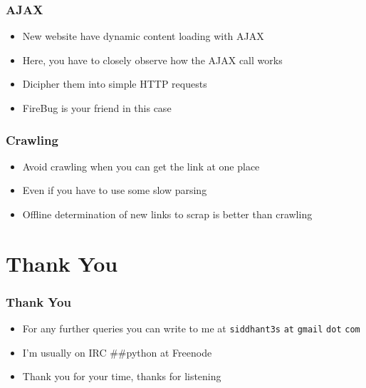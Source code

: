 \documentclass{beamer}
\begin{document}
\begin{frame}
\frametitle{AJAX}
\label{sec-10_4}


\begin{itemize}
\item New website have dynamic content loading with AJAX
\item Here, you have to closely observe how the AJAX call works
\item Dicipher them into simple HTTP requests
\item FireBug is your friend in this case
\end{itemize}
\end{frame}
\begin{frame}
\frametitle{Crawling}
\label{sec-10_5}


\begin{itemize}
\item Avoid crawling when you can get the link at one place
\item Even if you have to use some slow parsing
\item Offline determination of new links to scrap is better than crawling
\end{itemize}
\end{frame}
\section{Thank You}
\label{sec-11}
\begin{frame}
\frametitle{Thank You}
\label{sec-11_1}


\begin{itemize}
\item For any further queries you can write to me at \texttt{siddhant3s} \texttt{at} \texttt{gmail} \texttt{dot} \texttt{com}
\item I'm usually on IRC \#\#python at Freenode
\item Thank you for your time, thanks for listening
\end{itemize}
\end{frame}
\end{document}
